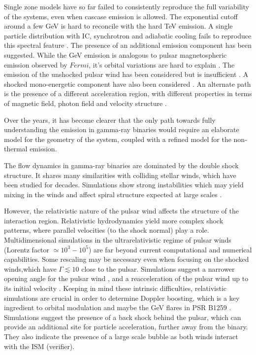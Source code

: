  Single zone models have so far failed to consistently reproduce the full variability of the systems, even when cascase emission is allowed. The exponential cutoff around a few GeV is hard to reconcile with the hard TeV emission. A single particle distribution with IC, synchrotron  and adiabatic  cooling fails to reproduce  this spectral feature \citep{2008MNRAS.383..467K,2013A&A...551A..17Z}.   The presence of an additional emission component has been suggested. While the GeV emission  is analogous to  pulsar magnetospheric emission observed by $Fermi$, it's orbital variations are hard to explain \citep{2012ApJ...749...54H}.   The emission of the unshocked pulsar wind \citep{2007MNRAS.380..320K}   has been considered but is insufficient \citep{2008APh....30..239S}.  A shocked mono-energetic  component have also been considered \citep{2013A&A...557A.127D}.  An alternate path is the presence of a different acceleration region, with different properties in terms of magnetic field, photon field and velocity structure \citep{2013A&A...551A..17Z}.

Over the years, it has become clearer that the only path towards fully understanding the emission in gamma-ray binaries would require an elaborate model for the geometry of the system, coupled with a refined model for the non-thermal emission. 

The flow dynamics in gamma-ray binaries are dominated by the double shock structure. It  shares many similarities with colliding stellar winds, which have been studied for decades. Simulations \citep{2009MNRAS.396.1743P,2011MNRAS.418.2618L} show strong instabilities which may  yield mixing in the winds \citep{2010MNRAS.403.1873Z}  and affect spiral structure expected at large scales \citep{2012A&A...546A..60L,2012A&A...544A..59B}.  

However, the relativistic nature of the pulsar wind affects the structure of the interaction region. Relativistic hydrodynamics yield more complex shock patterns, where parallel velocities (to the shock normal) play a role. Multidimensional simulations in the  ultrarelativistic regime of pulsar winds (Lorentz factor $\simeq 10^3-10^5$) are far beyond current computational and numerical capabilities. Some rescaling may be necessary even when focusing on the shocked winds,which have $\Gamma\lesssim 10$ close to the pulsar.  Simulations suggest a narrower opening angle for the pulsar wind \citep{2013A&A...560A..79L}, and a reacceleration of the pulsar wind up to its initial velocity \citep{2008MNRAS.387...63B}. Keeping in mind these intrinsic difficulties, relativistic simulations are crucial in order to determine Doppler boosting, which is a key ingredient to orbital modulation and maybe the GeV flares in PSR B1259 \citep{2012ApJ...753..127K}. Simulations suggest the presence of a back shock behind the pulsar, which can provide an additional site for particle acceleration, further away from the binary. They also indicate the presence of a large scale bubble as both winds interact with the ISM (verifier).





